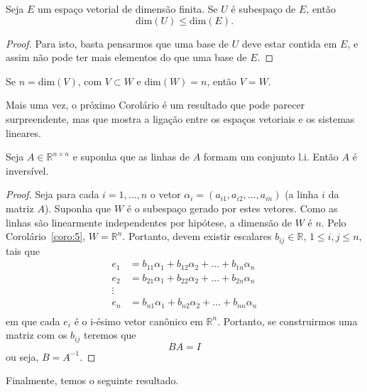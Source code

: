 \begin{coro}
	Seja $E$ um espaço vetorial de dimensão finita. Se $U$ é subespaço de $E$, então 
  \begin{equation*}
     \text{dim}(U) \leq \text{dim}(E).
  \end{equation*}
\end{coro}
\begin{proof}
Para isto, basta pensarmos que uma base de $U$ deve estar contida em $E$, e assim não pode ter mais elementos do que uma base de $E$.
\end{proof}

\begin{coro}\label{coro:5}
  Se $n=$dim$(V)$, com $V\subset W$ e dim$(W) = n$, então $V=W$.
\end{coro}

Mais uma vez, o próximo Corolário é um resultado que pode parecer surpreendente, mas que mostra a ligação entre os espaços vetoriais e os sistemas lineares.

\begin{coro}
  Seja $A\in {\mathbb{R}}^{n\times n}$ e suponha que as linhas de $A$ formam um conjunto l.i. Então $A$ é inversível.
\end{coro}
\begin{proof}
Seja para cada $i=1,\ldots, n$ o vetor $\alpha_i = (a_{i1}, a_{i2},\ldots, a_{in})$ (a linha $i$ da matriz $A$). Suponha que $W$ é o subespaço gerado por estes vetores. Como as linhas são linearmente independentes por hipótese, a dimensão de $W$ é $n$. Pelo Corolário~\ref{coro:5}, $W={\mathbb{R}}^n$. Portanto, devem existir escalares $b_{ij} \in {\mathbb{R}}$, $1\leq i,j\leq n$, tais que 
\begin{align*}
  e_1 &= b_{11}\alpha_1+b_{12}\alpha_2+\ldots+b_{1n}\alpha_n\\
  e_2 &= b_{21}\alpha_1+b_{22}\alpha_2+\ldots+b_{2n}\alpha_n\\
  \vdots  & \\
  e_n &= b_{n1}\alpha_1+b_{n2}\alpha_2+\ldots+b_{nn}\alpha_n\\
\end{align*}
em que cada $e_i$ é o i-ésimo vetor canônico em ${\mathbb{R}}^n$.
Portanto, se construirmos uma matriz com os $b_{ij}$ teremos que 
\begin{equation*}
   BA = I
\end{equation*}
ou seja, $B=A^{-1}$.
\end{proof}

Finalmente, temos o seguinte resultado.

